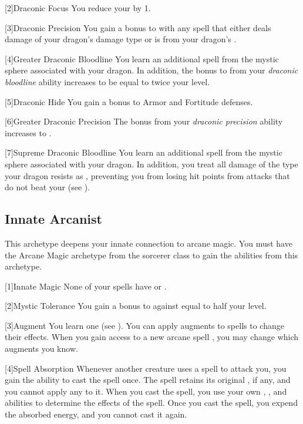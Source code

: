         [2]{Draconic Focus} You reduce your  by 1.

        [3]{Draconic Precision} You gain a  bonus to  with any spell that either deals damage of your dragon's damage type or is from your dragon's .

        [4]{Greater Draconic Bloodline} You learn an additional spell from the mystic sphere associated with your dragon.
        In addition, the bonus to  from your \textit{draconic bloodline} ability increases to be equal to twice your level.

        [5]{Draconic Hide} You gain a  bonus to Armor and Fortitude defenses.

        [6]{Greater Draconic Precision} The bonus from your \textit{draconic precision} ability increases to .

        [7]{Supreme Draconic Bloodline} You learn an additional spell from the mystic sphere associated with your dragon.
        In addition, you treat all damage of the type your dragon resists as , preventing you from losing hit points from attacks that do not beat your  (see ).

    \subsection{Innate Arcanist}
        This archetype deepens your innate connection to arcane magic.
        You must have the Arcane Magic archetype from the sorcerer class to gain the abilities from this archetype.

        [1]{Innate Magic} None of your spells have  or .

        [2]{Mystic Tolerance} You gain a bonus to  against  equal to half your level.

        [3]{Augment} You learn one  (see ).
        You can apply augments to spells to change their effects.
        When you gain access to a new arcane spell , you may change which augments you know.

        [4]{Spell Absorption} Whenever another creature uses a spell to attack you, you gain the ability to cast the spell once.
        The spell retains its original , if any, and you cannot apply any  to it.
        When you cast the spell, you use your own , , and abilities to determine the effects of the spell.
        Once you cast the spell, you expend the absorbed energy, and you cannot cast it again.

